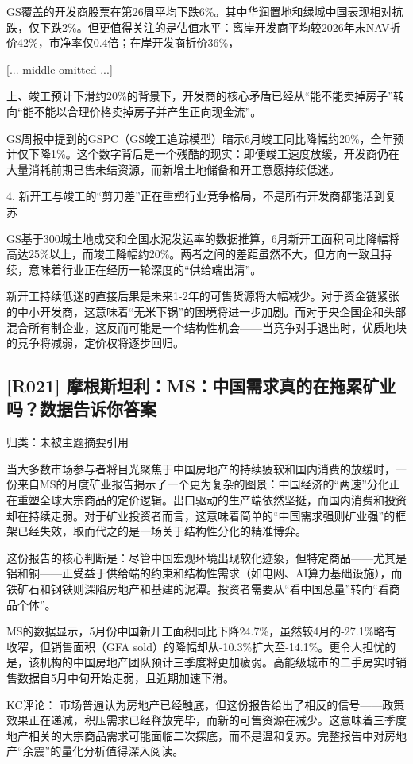 \documentclass[11pt]{ctexart}
\begin{document}
GS覆盖的开发商股票在第26周平均下跌6\%。其中华润置地和绿城中国表现相对抗跌，仅下跌2\%。但更值得关注的是估值水平：离岸开发商平均较2026年末NAV折价42\%，市净率仅0.4倍；在岸开发商折价36\%，

[... middle omitted ...]

上、竣工预计下滑约20\%的背景下，开发商的核心矛盾已经从“能不能卖掉房子”转向“能不能以合理价格卖掉房子并产生正向现金流”。

GS周报中提到的GSPC（GS竣工追踪模型）暗示6月竣工同比降幅约20\%，全年预计仅下降1\%。这个数字背后是一个残酷的现实：即便竣工速度放缓，开发商仍在大量消耗前期已售未结资源，而新增土地储备和开工意愿持续低迷。

4. 新开工与竣工的“剪刀差”正在重塑行业竞争格局，不是所有开发商都能活到复苏

GS基于300城土地成交和全国水泥发运率的数据推算，6月新开工面积同比降幅将高达25\%以上，而竣工降幅约20\%。两者之间的差距虽然不大，但方向一致且持续，意味着行业正在经历一轮深度的“供给端出清”。

新开工持续低迷的直接后果是未来1-2年的可售货源将大幅减少。对于资金链紧张的中小开发商，这意味着“无米下锅”的困境将进一步加剧。而对于央企国企和头部混合所有制企业，这反而可能是一个结构性机会——当竞争对手退出时，优质地块的竞争将减弱，定价权将逐步回归。

\subsection{[R021] 摩根斯坦利：MS：中国需求真的在拖累矿业吗？数据告诉你答案}
{\small\color{refgray}归类：未被主题摘要引用}

当大多数市场参与者将目光聚焦于中国房地产的持续疲软和国内消费的放缓时，一份来自MS的月度矿业报告揭示了一个更为复杂的图景：中国经济的“两速”分化正在重塑全球大宗商品的定价逻辑。出口驱动的生产端依然坚挺，而国内消费和投资却在持续走弱。对于矿业投资者而言，这意味着简单的“中国需求强则矿业强”的框架已经失效，取而代之的是一场关于结构性分化的精准博弈。

这份报告的核心判断是：尽管中国宏观环境出现软化迹象，但特定商品——尤其是铝和铜——正受益于供给端的约束和结构性需求（如电网、AI算力基础设施），而铁矿石和钢铁则深陷房地产和基建的泥潭。投资者需要从“看中国总量”转向“看商品个体”。

MS的数据显示，5月份中国新开工面积同比下降24.7\%，虽然较4月的-27.1\%略有收窄，但销售面积（GFA sold）的降幅却从-10.3\%扩大至-14.1\%。更令人担忧的是，该机构的中国房地产团队预计三季度将更加疲弱。高能级城市的二手房实时销售数据自5月中旬开始走弱，且近期加速下滑。

KC评论： 市场普遍认为房地产已经触底，但这份报告给出了相反的信号——政策效果正在递减，积压需求已经释放完毕，而新的可售资源在减少。这意味着三季度地产相关的大宗商品需求可能面临二次探底，而不是温和复苏。完整报告中对房地产“余震”的量化分析值得深入阅读。
\end{document}
